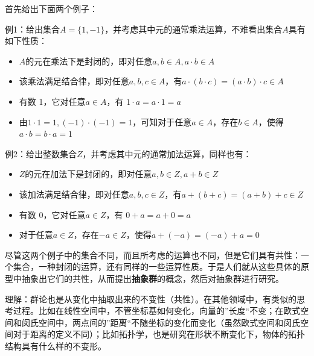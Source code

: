\documentclass[12pt]{article}
\begin{document}
\begin{framed}
\small{
首先给出下面两个例子：

例1：给出集合$A = \{1, -1\}$，并考虑其中元的通常乘法运算，不难看出集合$A$具有如下性质：
\begin{itemize}
\setlength{\itemsep}{0pt}
\setlength{\parsep}{0pt}
\setlength{\parskip}{0pt}
    \item $A$的元在乘法下是封闭的，即对任意$a,b \in A, a\cdot b \in A$
    \item 该乘法满足结合律，即对任意$a,b,c \in A$，有$ a\cdot (b\cdot c) = (a\cdot b)\cdot c \in A$
    \item 有数 1，它对任意$a \in A$，有 $1 \cdot a = a \cdot 1 = a$
    \item 由$1 \cdot 1 = 1, (-1) \cdot (-1) = 1$，可知对于任意$a \in A$，存在$b \in A$，使得$a\cdot b = b\cdot a = 1$
\end{itemize}

例2：给出整数集合$Z$，并考虑其中元的通常加法运算，同样也有：
\begin{itemize}
\setlength{\itemsep}{0pt}
\setlength{\parsep}{0pt}
\setlength{\parskip}{0pt}
    \item $Z$的元在加法下是封闭的，即对任意$a,b \in Z, a+b \in Z$
    \item 该加法满足结合律，即对任意$a,b,c \in Z$，有$ a + (b + c) = (a + b) + c \in Z$
    \item 有数 0，它对任意$a \in Z$，有 $0 + a = a + 0 = a$
    \item 对于任意$a \in Z$，存在$-a \in Z$，使得$a + (-a) = (-a)+ a = 0$
\end{itemize}
}
\end{framed}

尽管这两个例子中的集合不同，而且所考虑的运算也不同，但是它们具有共性：一个集合，一种封闭的运算，还有同样的一些运算性质。于是人们就从这些具体的原型中抽象出它们的共性，从而提出\textbf{抽象群}的概念，然后对抽象群进行研究。

\begin{framed}
理解：群论也是从变化中抽取出来的不变性（共性）。在其他领域中，有类似的思考过程。比如在线性空间中，不管坐标基如何变化，向量的”长度“不变；在欧式空间和闵氏空间中，两点间的”距离“不随坐标的变化而变化（虽然欧式空间和闵氏空间对于距离的定义不同）；比如拓扑学，也是研究在形状不断变化下，物体的拓扑结构具有什么样的不变形。
\end{framed}
\end{document}

